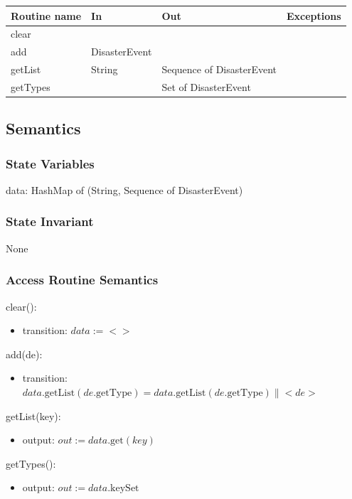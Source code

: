 \documentclass[12pt]{article}
\begin{document}
\begin{tabular}{| l | l | l | l |}
\hline
\textbf{Routine name} & \textbf{In} & \textbf{Out} & \textbf{Exceptions}\\
\hline
clear & ~ & ~ & ~ \\
\hline
add & DisasterEvent & ~ & ~ \\
\hline
getList & String & Sequence of DisasterEvent & ~ \\
\hline
getTypes & ~ & Set of DisasterEvent & ~ \\
\hline
\end{tabular}

\subsection {Semantics}

\subsubsection {State Variables}

data: HashMap of (String, Sequence of DisasterEvent)

\subsubsection {State Invariant}

None

\newpage
\subsubsection {Access Routine Semantics}

clear():
\begin{itemize}
\item transition: $data := <>$
\end{itemize}

\noindent add(de):
\begin{itemize}
\item transition: $data.\mbox{getList}(de.\mbox{getType}) = data.\mbox{getList}(de.\mbox{getType}) \| <de>$
\end{itemize}

\noindent getList(key):
\begin{itemize}
\item output: $out := data.\mbox{get}(key)$
\end{itemize}

\noindent getTypes():
\begin{itemize}
\item output: $out := data.\mbox{keySet}$
\end{itemize}
\end{document}
